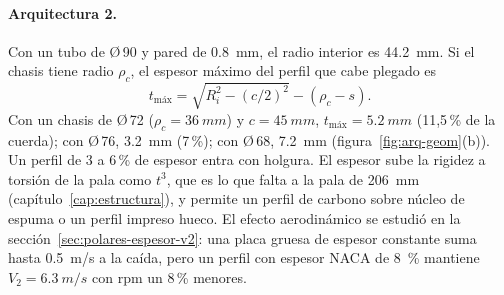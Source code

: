 \paragraph{Arquitectura 2.} Con un tubo de Ø\,90 y pared de \SI{0.8}{mm}, el radio interior
es \SI{44.2}{mm}. Si el chasis tiene radio $\rho_c$, el espesor máximo del perfil que cabe
plegado es
\begin{equation}
  t_\text{máx}=\sqrt{R_i^2-(c/2)^2}-(\rho_c-s).
  \label{eq:arq-tmax}
\end{equation}
Con un chasis de Ø\,72 ($\rho_c=\SI{36}{mm}$) y $c=\SI{45}{mm}$, $t_\text{máx}=\SI{5.2}{mm}$ (11,5\,\% de la
cuerda); con Ø\,76, \SI{3.2}{mm} (7\,\%); con Ø\,68, \SI{7.2}{mm}
(figura~\ref{fig:arq-geom}(b)). Un perfil de 3 a 6\,\% de espesor entra con holgura. El
espesor sube la rigidez a torsión de la pala como $t^3$, que es lo que falta a la pala
de \SI{206}{mm} (capítulo~\ref{cap:estructura}), y permite un perfil de carbono sobre núcleo de
espuma o un perfil impreso hueco. El efecto aerodinámico se estudió en la
sección~\ref{sec:polares-espesor-v2}: una placa gruesa de espesor constante suma hasta \SI{0.5}{m/s} a la caída, pero un perfil con espesor
NACA de \SI{8}{\percent} mantiene $V_2=\SI{6.3}{m/s}$ con rpm un 8\,\% menores.

